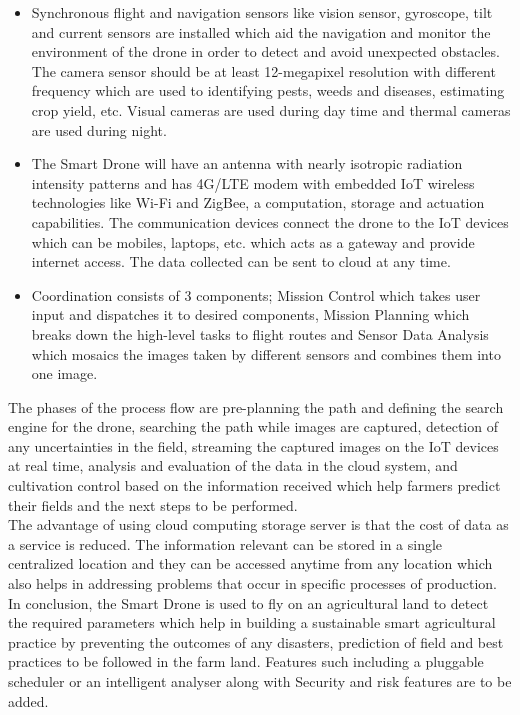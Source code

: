 \documentclass{article}
\begin{document}
\begin{flushleft}
\begin{itemize}
\item Synchronous flight and navigation sensors like vision sensor, gyroscope, tilt and current sensors are installed which aid the navigation and monitor the environment of the drone in order to detect and avoid unexpected obstacles. The camera sensor should be at least 12-megapixel resolution with different frequency which are used to identifying pests, weeds and diseases, estimating crop yield, etc. Visual cameras are used during day time and thermal cameras are used during night.
\item The Smart Drone will have an antenna with nearly isotropic radiation intensity patterns and has 4G/LTE modem with embedded IoT wireless technologies like Wi-Fi and ZigBee, a computation, storage and actuation capabilities. The communication devices connect the drone to the IoT devices which can be mobiles, laptops, etc. which acts as a gateway and provide internet access. The data collected can be sent to cloud at any time.
\item Coordination consists of 3 components; Mission Control which takes user input and dispatches it to desired components, Mission Planning which breaks down the high-level tasks to flight routes and Sensor Data Analysis which mosaics the images taken by different sensors and combines them into one image.
\end{itemize} \par
The phases of the process flow are pre-planning the path and defining the search engine for the drone, searching the path while images are captured, detection of any uncertainties in the field, streaming the captured images on the IoT devices at real time, analysis and evaluation of the data in the cloud system, and cultivation control based on the information received which help farmers predict their fields and the next steps to be performed. \\
The advantage of using cloud computing storage server is that the cost of data as a service is reduced. The information relevant can be stored in a single centralized location and they can be accessed anytime from any location which also helps in addressing problems that occur in specific processes of production. \\
In conclusion, the Smart Drone is used to fly on an agricultural land to detect the required parameters which help in building a sustainable smart agricultural practice by preventing the outcomes of any disasters, prediction of field and best practices to be followed in the farm land. Features such including a pluggable scheduler or an intelligent analyser along with Security and risk features are to be added. \\
\end{flushleft}
\end{document}
